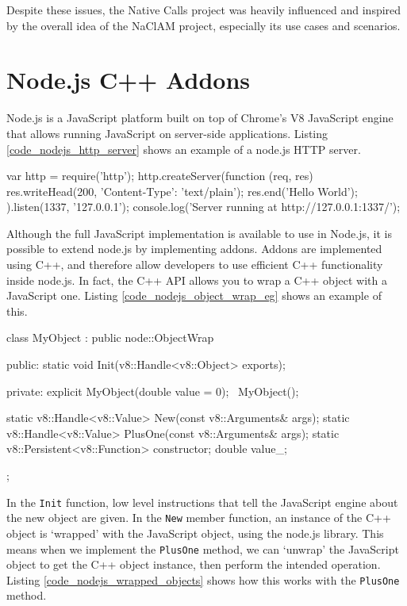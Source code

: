 Despite these issues, the Native Calls project was heavily influenced and inspired by the overall idea of the NaClAM project, especially its use cases and scenarios.


\section{Node.js C++ Addons} %
\label{sec:node_js_c_bindings}
Node.js is a JavaScript platform built on top of Chrome's V8 JavaScript engine that allows running JavaScript on server-side applications. Listing \ref{code_nodejs_http_server} shows an example of a node.js HTTP server.

\begin{code}
var http = require('http');
http.createServer(function (req, res) {
  res.writeHead(200, {'Content-Type': 'text/plain'});
  res.end('Hello World\n');
}).listen(1337, '127.0.0.1');
console.log('Server running at http://127.0.0.1:1337/');
\end{code}

Although the full JavaScript implementation is available to use in Node.js, it is possible to extend node.js by implementing addons. Addons are implemented using C++, and therefore allow developers to use efficient C++ functionality inside node.js. In fact, the C++ API allows you to wrap a C++ object with a JavaScript one. Listing \ref{code_nodejs_object_wrap_eg} shows an example of this.

\begin{code}
class MyObject : public node::ObjectWrap {
 public:
  static void Init(v8::Handle<v8::Object> exports);

 private:
  explicit MyObject(double value = 0);
  ~MyObject();

  static v8::Handle<v8::Value> New(const v8::Arguments& args);
  static v8::Handle<v8::Value> PlusOne(const v8::Arguments& args);
  static v8::Persistent<v8::Function> constructor;
  double value_;
};
\end{code}

In the \lstinline{Init} function, low level instructions that tell the JavaScript engine about the new object are given. In the \lstinline{New} member function, an instance of the C++ object is `wrapped' with the JavaScript object, using the node.js library. This means when we implement the \lstinline{PlusOne} method, we can `unwrap' the JavaScript object to get the C++ object instance, then perform the intended operation. Listing \ref{code_nodejs_wrapped_objects} shows how this works with the \lstinline{PlusOne} method.

